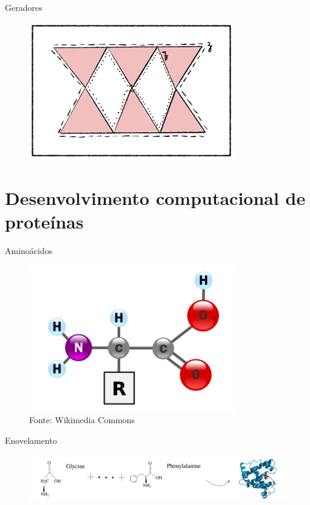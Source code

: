 \documentclass[10pt]{beamer}
\begin{document}
\begin{frame}{Geradores}
    \begin{figure}
        \centering
        \includegraphics[width=0.8\textwidth]{../images/nonoptcyc.png}
    \end{figure}
\end{frame}

\section{Desenvolvimento computacional de proteínas}

\begin{frame}{Aminoácidos}
    \begin{figure}
        \centering
        \includegraphics[width=0.8\textwidth]{images/aminoacid.png}
        \caption*{Fonte: Wikimedia Commons}
    \end{figure}  
\end{frame}

\begin{frame}{Enovelamento}
    \begin{figure}
        \centering
        \includegraphics[width=1.0\textwidth]{images/aminoplusprotein.pdf}
    \end{figure} 
\end{frame}
\end{document}
